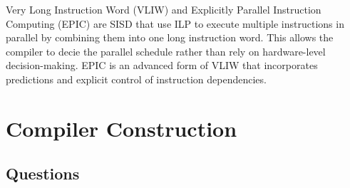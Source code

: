 \documentclass[a4paper, 12pt, oneside]{book}
\begin{document}
Very Long Instruction Word (VLIW) and Explicitly Parallel Instruction Computing (EPIC) are SISD that use ILP to execute multiple instructions in parallel by combining them into one long instruction word. This allows the compiler to decie the parallel schedule rather than rely on hardware-level decision-making. EPIC is an advanced form of VLIW that incorporates predictions and explicit control of instruction dependencies.


\chapter{Compiler Construction}

\section{Questions}
\end{document}
